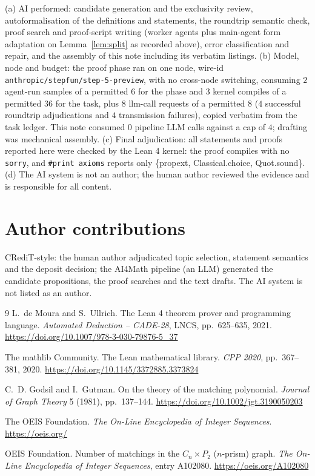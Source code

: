 \documentclass[11pt]{article}
\theoremstyle{definition}
\begin{document}
(a) AI performed: candidate generation and the exclusivity review,
autoformalisation of the definitions and statements, the roundtrip semantic
check, proof search and proof-script writing (worker agents plus main-agent
form adaptation on Lemma~\ref{lem:split} as recorded above), error
classification and repair, and the assembly of this note including its
verbatim listings. (b) Model, node and budget: the proof phase ran on one
node, wire-id \texttt{anthropic/stepfun/step-5-preview}, with no cross-node
switching, consuming $2$ agent-run samples of a permitted $6$ for the phase
and $3$ kernel compiles of a permitted $36$ for the task, plus $8$
llm-call requests of a permitted $8$ ($4$ successful roundtrip adjudications
and $4$ transmission failures), copied verbatim from the task ledger. This
note consumed $0$ pipeline LLM calls against a cap of $4$; drafting was
mechanical assembly. (c) Final adjudication: all statements and proofs
reported here were checked by the Lean 4 kernel: the proof compiles with no
\texttt{sorry}, and \texttt{\#print axioms} reports only \{propext,
Classical.choice, Quot.sound\}. (d) The AI system is not an author; the human
author reviewed the evidence and is responsible for all content.

\section*{Author contributions}

CRediT-style: the human author adjudicated topic selection, statement
semantics and the deposit decision; the AI4Math pipeline (an LLM) generated
the candidate propositions, the proof searches and the text drafts. The AI
system is not listed as an author.

\begin{thebibliography}{9}
L.~de Moura and S.~Ullrich.
\newblock The Lean 4 theorem prover and programming language.
\newblock \emph{Automated Deduction -- CADE-28}, LNCS, pp.~625--635, 2021.
\url{https://doi.org/10.1007/978-3-030-79876-5_37}

The mathlib Community.
\newblock The Lean mathematical library.
\newblock \emph{CPP 2020}, pp.~367--381, 2020.
\url{https://doi.org/10.1145/3372885.3373824}

C.~D. Godsil and I.~Gutman.
\newblock On the theory of the matching polynomial.
\newblock \emph{Journal of Graph Theory} 5 (1981), pp.~137--144.
\url{https://doi.org/10.1002/jgt.3190050203}

The OEIS Foundation.
\newblock \emph{The On-Line Encyclopedia of Integer Sequences}.
\newblock \url{https://oeis.org/}

OEIS Foundation.
\newblock Number of matchings in the $C_n\times P_2$ ($n$-prism) graph.
\newblock \emph{The On-Line Encyclopedia of Integer Sequences}, entry
A102080.
\url{https://oeis.org/A102080}
\end{thebibliography}
\end{document}
